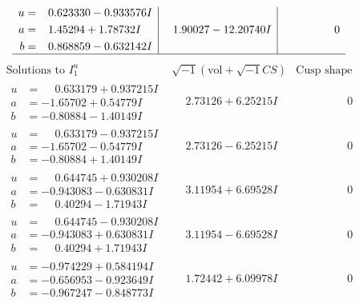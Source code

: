 \documentclass[1p]{elsarticle_modified}
\theoremstyle{definition}
\newcommand{\I}{\sqrt{-1}}
\begin{document}
$$\begin{array}{c|c|c}
\begin{aligned}
u &= \phantom{-}0.623330 - 0.933576 I \\
a &= \phantom{-}1.45294 + 1.78732 I \\
b &= \phantom{-}0.868859 - 0.632142 I\end{aligned}
 & \phantom{-}1.90027 - 12.20740 I & \phantom{-0.000000 } 0\\
 \hline 
 \end{array}$$\newpage$$\begin{array}{c|c|c}  
\text{Solutions to }I^u_{1}& \I (\text{vol} + \sqrt{-1}CS) & \text{Cusp shape}\\
 \hline 
\begin{aligned}
u &= \phantom{-}0.633179 + 0.937215 I \\
a &= -1.65702 + 0.54779 I \\
b &= -0.80884 - 1.40149 I\end{aligned}
 & \phantom{-}2.73126 + 6.25215 I & \phantom{-0.000000 } 0 \\ \hline\begin{aligned}
u &= \phantom{-}0.633179 - 0.937215 I \\
a &= -1.65702 - 0.54779 I \\
b &= -0.80884 + 1.40149 I\end{aligned}
 & \phantom{-}2.73126 - 6.25215 I & \phantom{-0.000000 } 0 \\ \hline\begin{aligned}
u &= \phantom{-}0.644745 + 0.930208 I \\
a &= -0.943083 - 0.630831 I \\
b &= \phantom{-}0.40294 - 1.71943 I\end{aligned}
 & \phantom{-}3.11954 + 6.69528 I & \phantom{-0.000000 } 0 \\ \hline\begin{aligned}
u &= \phantom{-}0.644745 - 0.930208 I \\
a &= -0.943083 + 0.630831 I \\
b &= \phantom{-}0.40294 + 1.71943 I\end{aligned}
 & \phantom{-}3.11954 - 6.69528 I & \phantom{-0.000000 } 0 \\ \hline\begin{aligned}
u &= -0.974229 + 0.584194 I \\
a &= -0.656953 - 0.923649 I \\
b &= -0.967247 - 0.848773 I\end{aligned}
 & \phantom{-}1.72442 + 6.09978 I & \phantom{-0.000000 } 0 \\ \hline\begin{aligned}

\end{aligned}
\end{array}$$
\end{document}
